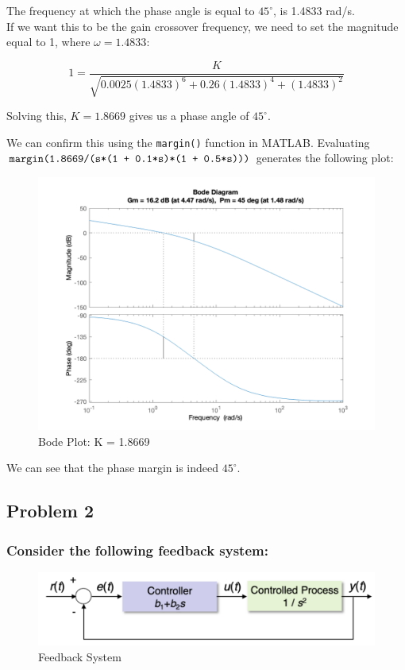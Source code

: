 \documentclass[12pt, letterpaper]{../assignment}
\begin{document}
The frequency at which the phase angle is equal to $45^\circ$, is 1.4833 rad/s.
\\
If we want this to be the gain crossover frequency, we need to set the magnitude equal to 1,
where $\omega = 1.4833 $:

$$ 1 = \frac{K}{\sqrt{0.0025 (1.4833)^6 + 0.26 (1.4833)^4 + (1.4833)^2 }}$$

\begin{answer}
Solving this, $K = 1.8669$ gives us a phase angle of $45^\circ$.
\end{answer}

We can confirm this using the \texttt{margin()} function in MATLAB.
Evaluating \\ $\texttt{\text{margin}(1.8669/(s*(1 + 0.1*s)*(1 + 0.5*s)))}$ generates the following plot:

\begin{figure}[H]
    \centering
    \includegraphics[width=1\linewidth]{./figures/BodePlot_K_1.8669.png}
    \caption{Bode Plot: K = 1.8669}
\end{figure}

We can see that the phase margin is indeed $45^\circ$. 

\subsection*{Problem 2}
\subsubsection*{Consider the following feedback system:}
\begin{figure}[H]
    \centering
    \includegraphics[width=0.7\linewidth]{./figures/Q2_Block_Diagram.png}
    \caption{Feedback System}
\end{figure}
\end{document}
